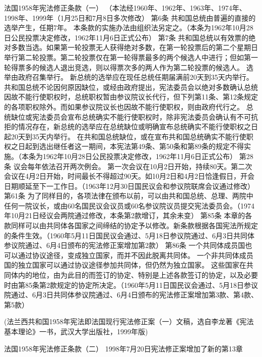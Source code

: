                     法国1958年宪法修正条款（一）
   （本法经1960年、1962年、1963年、1974年、1998年、1999年（1月25日和7月8日多次修改）
    第6条 共和国总统由普遍的直接的选举产生，任期7年。
    本条款的实施办法由组织法另定之。（本条为1962年10月28日公民投票决定修改，1962年11月6日正式公布）
    第7条 共和国总统以有效票的绝对多数当选。如果第一轮投票无人获得绝对多数，在第一轮投票后的第二个星期日举行第二轮投票。第二轮投票仅在第一轮得票最多的两个候选人中进行；但如第一轮得票多的候选人退出竞选，则以得票次多的两人作为第二轮投票的候选人。
    选举由政府召集举行。
    新总统的选举应在现任总统任期届满前20天到35天内举行。
    共和国总统不论因何原因缺位，或经由政府提出，宪法委员会以绝对多数确认总统因故不能行使职权时，总统职权暂由参议院议长代行，但下列第11条、第12条规定的各项职权除外。而如果参议院议长也因故不能行使职权，则由政府代行之。
    总统缺位或宪法委员会宣布总统确实不能行使职权时，除非宪法委员会确认有不可抗拒的情况存在，新总统的选举应在总统缺位或明确宣布总统确实不能行使职权之日起20天到35天内举行。
    在共和国总统缺位，或在宣布共和国总统确实不能行使职权之日起到选出继任者这一期间，本宪法第49条、第50条和第89条的规定不得实施。（本条为1962年10月28日公民投票决定修改，1962年11月6日正式公布）
    第28条 议会每年依法召开两次例会。
    第一次会议在10月2日开始，持续80天。第二次会议在4月2日开始，时间最长不得超过90天。如10月2日和4月2日恰逢假日，开会日期顺延至下一工作日。（1963年12月30日国民议会和参议院联席会议通过修改）
    第61条 为了同样目的，各项法律在颁布以前，可以由共和国总统、总理、两院中任何一院议长，或由60名国民议会议员或60名参议院议员提交宪法委员会。（1974年10月21日经议会两院通过修改，本条第2款增订，其余未变）
    第85条 本章的各款同样可以由共同体各国家之间缔结的协定予以修改。新条款根据各国宪法所规定的条件生效。（1960年5月11日国民议会通过、5月18日参议院通过、6月3日共同体参议院通过、6月4日颁布的宪法修正案增加第2款）
    第86条 一个共同体成员国也可以通过协议途径，变成独立国家，而并不因此脱离共同体。
    一个非共同体成员国的独立国家可以通过协议途径参加共同体，但仍然为独立国家。
    这些国家在共同体内的地位，由为此目的而签订的协定、特别是上述各款签订的协定，以及必要时由第85条第2款规定的协定所决定。（1960年5月11日国民议会通过、5月18日参议院通过、6月3日共同体参议院通过、6月4日颁布的宪法修正案增加第3款、第4款、第5款）
           
(法兰西共和国1958年宪法即法国现行宪法修正案（一）文稿，选自李龙著《宪法基本理论》一书，武汉大学出版社，1999年版)
 
                      法国1958年宪法修正条款（二）          
              1998年7月20日宪法修正案增加了新的第13章
 
